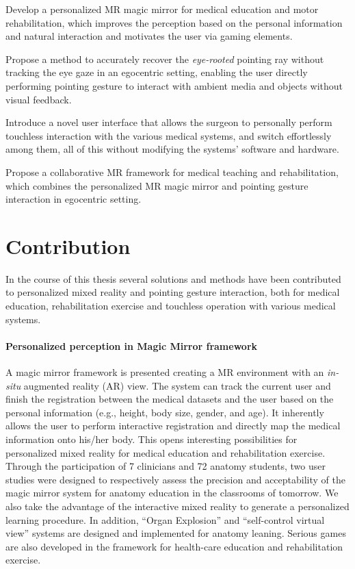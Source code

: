\begin{description} [font=$\bullet$\scshape\bfseries]
	\item Develop a personalized MR magic mirror for medical education and motor rehabilitation, which improves the perception based on the personal information and natural interaction and motivates the user via gaming elements.%
	\item Propose a method to accurately recover the \textit{eye-rooted} pointing ray without tracking the eye gaze in an egocentric setting, enabling the user directly performing pointing gesture to interact with ambient media and objects without visual feedback.
	\item Introduce a novel user interface that allows the surgeon to personally perform touchless interaction with the various medical systems, and switch effortlessly among them, all of this without modifying the systems' software and hardware.
	\item Propose a collaborative MR framework for medical teaching and rehabilitation, which combines the personalized MR magic mirror and pointing gesture interaction in egocentric setting. 
\end{description}

\section{Contribution}
In the course of this thesis several solutions and methods have been contributed to personalized mixed reality and pointing gesture interaction, both for medical education, rehabilitation exercise and touchless operation with various medical systems.

\paragraph{Personalized perception in Magic Mirror framework}
A magic mirror framework is presented creating a MR environment with an \textit{in-situ} augmented reality (AR) view. The system can track the current user and finish the registration between the medical datasets and the user based on the personal information (e.g., height, body size, gender, and age). It inherently allows the user to perform interactive registration and directly map the medical information onto his/her body. This opens interesting possibilities for personalized mixed reality for medical education and rehabilitation exercise. Through the participation of 7 clinicians and 72 anatomy students, two user studies were designed to respectively assess the precision and acceptability of the magic mirror system for anatomy education in the classrooms of tomorrow. We also take the advantage of the interactive mixed reality to generate a personalized learning procedure. In addition, ``Organ Explosion'' and ``self-control virtual view'' systems are designed and implemented for anatomy leaning. Serious games are also developed in the framework for health-care education and rehabilitation exercise.

